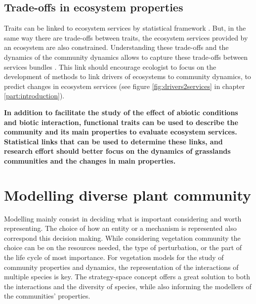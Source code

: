 \subsection{Trade-offs in ecosystem properties}

Traits can be linked to ecosystem services by statistical framework \parencite{lavorel_how_2014}. But, in the same way there are trade-offs between traits, the ecosystem services provided by an ecosystem are also constrained. Understanding these trade-offs and the dynamics of the community dynamics allows to capture these trade-offs between services bundles \parencite{lamarque_plant_2014}. This link should encourage ecologist to focus on the development of methods to link drivers of ecosystems to community dynamics, to predict changes in ecosystem services (see figure \ref{fig:drivers2services} in chapter \ref{part:introduction}).



\textbf{ In addition to facilitate the study of the effect of abiotic conditions and biotic interaction, functional traits can be used to describe the community and its main properties to evaluate ecosystem services. Statistical links that can be used to determine these links, and research effort should better focus on the dynamics of grasslands communities and the changes in main properties.}




\section{Modelling diverse plant community}

Modelling mainly consist in deciding what is important considering and worth representing. The choice of how an entity or a mechanism is represented also correspond this decision making. While considering vegetation community the choice can be on the resources needed, the type of perturbation, or the part of the life cycle of most importance. For vegetation models for the study of community properties and dynamics, the representation of the interactions of multiple species is key. The strategy-space concept offers a great solution to both the interactions and the diversity of species, while also informing the modellers of the communities' properties.

